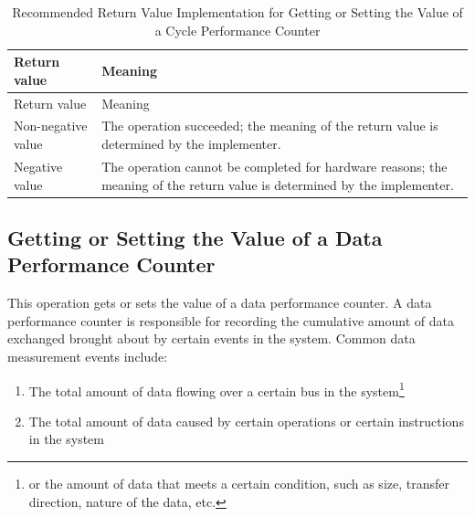 \begin{xltabular}{\textwidth}{@{}>{\hsize\raggedright\arraybackslash}X>{\hsize\raggedright\arraybackslash}X@{}}
\caption{Recommended Return Value Implementation for Getting or Setting the Value of a Cycle Performance Counter}\label{tab:8-65-get-or-set-cycle-performance-counter-suggested-return-values}\\
\toprule
Return value & Meaning\tabularnewline
\endfirsthead
\toprule
Return value & Meaning\tabularnewline
\midrule
\endhead
\bottomrule
\endlastfoot
    Non-negative value & The operation succeeded; the meaning of the return value is determined by the implementer.\tabularnewline
    Negative value & The operation cannot be completed for hardware reasons; the meaning of the return value is determined by the implementer.\tabularnewline
\end{xltabular}
\nopagebreak[4]

\subsection{Getting or Setting the Value of a Data Performance Counter}\label{subsec:8-get-or-set-data-performance-counter}
\nopagebreak[4]

This operation gets or sets the value of a data performance counter. A data performance counter is responsible for recording the cumulative amount of data exchanged brought about by certain events in the system. Common data measurement events include:

\begin{enumerate}
\def\labelenumi{\arabic{enumi}.}
\item
  The total amount of data flowing over a certain bus in the system\footnote{or the amount of data that meets a certain condition, such as size, transfer direction, nature of the data, etc.}
\item
  The total amount of data caused by certain operations or certain instructions in the system
\end{enumerate}

